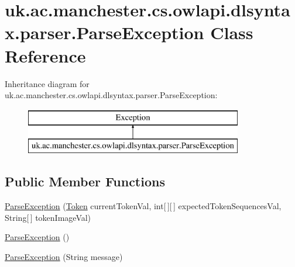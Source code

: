 \hypertarget{classuk_1_1ac_1_1manchester_1_1cs_1_1owlapi_1_1dlsyntax_1_1parser_1_1_parse_exception}{\section{uk.\-ac.\-manchester.\-cs.\-owlapi.\-dlsyntax.\-parser.\-Parse\-Exception Class Reference}
\label{classuk_1_1ac_1_1manchester_1_1cs_1_1owlapi_1_1dlsyntax_1_1parser_1_1_parse_exception}
}
Inheritance diagram for uk.\-ac.\-manchester.\-cs.\-owlapi.\-dlsyntax.\-parser.\-Parse\-Exception\-:\begin{figure}[H]
\begin{center}
\leavevmode
\includegraphics[height=2.000000cm]{classuk_1_1ac_1_1manchester_1_1cs_1_1owlapi_1_1dlsyntax_1_1parser_1_1_parse_exception}
\end{center}
\end{figure}
\subsection*{Public Member Functions}
\begin{DoxyCompactItemize}
\item 
\hyperlink{classuk_1_1ac_1_1manchester_1_1cs_1_1owlapi_1_1dlsyntax_1_1parser_1_1_parse_exception_a65d019ee105cff7116ca70038bb95cc0}{Parse\-Exception} (\hyperlink{classuk_1_1ac_1_1manchester_1_1cs_1_1owlapi_1_1dlsyntax_1_1parser_1_1_token}{Token} current\-Token\-Val, int\mbox{[}$\,$\mbox{]}\mbox{[}$\,$\mbox{]} expected\-Token\-Sequences\-Val, String\mbox{[}$\,$\mbox{]} token\-Image\-Val)
\item 
\hyperlink{classuk_1_1ac_1_1manchester_1_1cs_1_1owlapi_1_1dlsyntax_1_1parser_1_1_parse_exception_ae01bffaf73e1d6b29a695ef6984260f7}{Parse\-Exception} ()
\item 
\hyperlink{classuk_1_1ac_1_1manchester_1_1cs_1_1owlapi_1_1dlsyntax_1_1parser_1_1_parse_exception_a9ef7945bf7b5f5ff98f33b83855198cb}{Parse\-Exception} (String message)
\end{DoxyCompactItemize}
